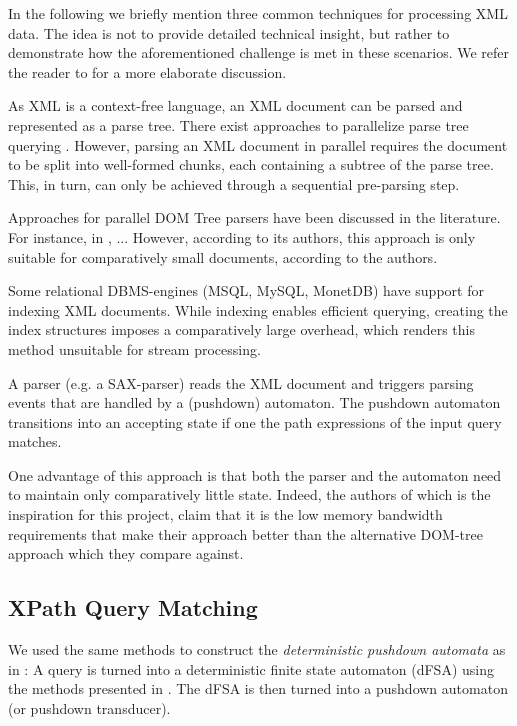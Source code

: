 In the following we briefly mention three common techniques for processing XML
data. The idea is not to provide detailed technical insight, but rather to
demonstrate how the aforementioned challenge is met in these scenarios. We refer
the reader to  for a more elaborate discussion.

 As XML is a context-free language, an XML
document can be parsed and represented as a parse tree. There exist approaches
to parallelize parse tree querying . However, parsing
an XML document in parallel requires the document to be split into well-formed
chunks, each containing a subtree of the parse tree. This, in turn, can only be
achieved through a sequential pre-parsing step.

Approaches for parallel DOM Tree parsers have been discussed in the literature.
For instance, in , ... However, according to its authors, this
approach is only suitable for comparatively small documents, according to the
authors.


Some relational DBMS-engines (MSQL, MySQL, MonetDB) have support for indexing
XML documents. While indexing enables efficient querying, creating the index
structures imposes a comparatively large overhead, which renders this method
unsuitable for stream processing.


A parser (e.g. a SAX-parser) reads the XML document and triggers parsing events
that are handled by a (pushdown) automaton. The pushdown automaton transitions
into an accepting state if one the path expressions of the input query matches.

One advantage of this approach is that both the parser and the automaton need to
maintain only comparatively little state. Indeed, the authors of 
which is the inspiration for this project, claim that it is the low memory
bandwidth requirements that make their approach better than the alternative
DOM-tree approach which they compare against.

\subsection{XPath Query Matching}

We used the same methods to construct the \emph{deterministic pushdown automata}
as in : A query is turned into a deterministic
finite state automaton (dFSA) using the methods  presented
in . The dFSA is then turned into a
pushdown automaton (or pushdown transducer).

